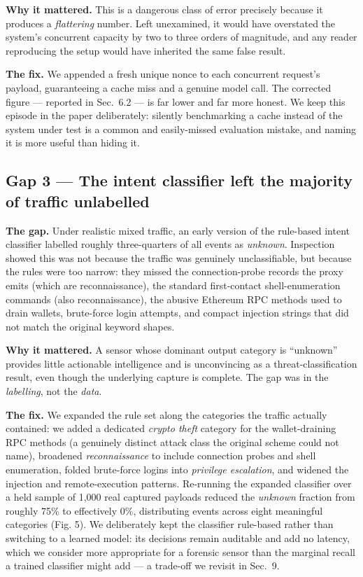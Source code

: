 \documentclass[conference]{IEEEtran}
\begin{document}
\textbf{Why it mattered.} This is a dangerous class of error precisely because it produces a \emph{flattering} number. Left unexamined, it would have overstated the system's concurrent capacity by two to three orders of magnitude, and any reader reproducing the setup would have inherited the same false result.

\textbf{The fix.} We appended a fresh unique nonce to each concurrent request's payload, guaranteeing a cache miss and a genuine model call. The corrected figure --- reported in Sec.~6.2 --- is far lower and far more honest. We keep this episode in the paper deliberately: silently benchmarking a cache instead of the system under test is a common and easily-missed evaluation mistake, and naming it is more useful than hiding it.

\subsection{Gap 3 --- The intent classifier left the majority of traffic unlabelled}

\textbf{The gap.} Under realistic mixed traffic, an early version of the rule-based intent classifier labelled roughly three-quarters of all events as \emph{unknown}. Inspection showed this was not because the traffic was genuinely unclassifiable, but because the rules were too narrow: they missed the connection-probe records the proxy emits (which are reconnaissance), the standard first-contact shell-enumeration commands (also reconnaissance), the abusive Ethereum RPC methods used to drain wallets, brute-force login attempts, and compact injection strings that did not match the original keyword shapes.

\textbf{Why it mattered.} A sensor whose dominant output category is ``unknown'' provides little actionable intelligence and is unconvincing as a threat-classification result, even though the underlying capture is complete. The gap was in the \emph{labelling}, not the \emph{data}.

\textbf{The fix.} We expanded the rule set along the categories the traffic actually contained: we added a dedicated \emph{crypto theft} category for the wallet-draining RPC methods (a genuinely distinct attack class the original scheme could not name), broadened \emph{reconnaissance} to include connection probes and shell enumeration, folded brute-force logins into \emph{privilege escalation}, and widened the injection and remote-execution patterns. Re-running the expanded classifier over a held sample of 1{,}000 real captured payloads reduced the \emph{unknown} fraction from roughly 75\% to effectively 0\%, distributing events across eight meaningful categories (Fig. 5). We deliberately kept the classifier rule-based rather than switching to a learned model: its decisions remain auditable and add no latency, which we consider more appropriate for a forensic sensor than the marginal recall a trained classifier might add --- a trade-off we revisit in Sec.~9.
\end{document}
